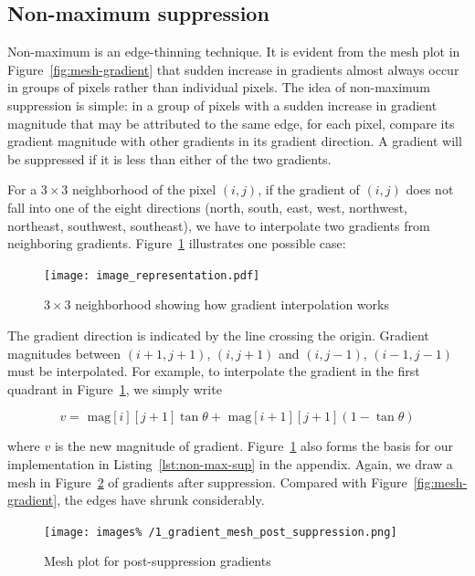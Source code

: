 \documentclass{ee208report}
\begin{document}
\begin{multicols*}{2}
\subsection{Non-maximum suppression}

Non-maximum is an edge-thinning technique. It is evident from the mesh plot in
Figure~\ref{fig:mesh-gradient} that sudden increase in gradients almost always
occur in groups of pixels rather than individual pixels. The idea of
non-maximum suppression is simple: in a group of pixels with a sudden increase
in gradient magnitude that may be attributed to the same edge, for each pixel,
compare its gradient magnitude with other gradients in its gradient direction.
A gradient will be suppressed if it is less than either of the two gradients.

For a $3 \times 3$ neighborhood of the pixel $(i, j)$, if the gradient of
$(i, j)$ does not fall into one of the eight directions (north, south, east,
west, northwest, northeast, southwest, southeast), we have to interpolate two
gradients from neighboring gradients. Figure~\ref{fig:neighborhood} illustrates
one possible case:

\begin{figure}[H]
    \texttt{[image: image\_representation.pdf]}
    \caption{$3 \times 3$ neighborhood showing how gradient interpolation works}
    \label{fig:neighborhood}
\end{figure}

The gradient direction is indicated by the line crossing the origin. Gradient
magnitudes between $(i + 1, j + 1)$, $(i, j + 1)$ and $(i, j - 1)$,
$(i - 1, j - 1)$ must be interpolated. For example, to interpolate the gradient
in the first quadrant in Figure~\ref{fig:neighborhood}, we simply write

\[
    v = \textrm{ mag}[i][j + 1] \tan \theta + \textrm{ mag}[i + 1][j + 1] (1 -
    \tan \theta)
\]

where $v$ is the new magnitude of gradient. Figure~\ref{fig:neighborhood} also
forms the basis for our implementation in Listing~\ref{lst:non-max-sup} in the
appendix. Again, we draw a mesh in Figure~\ref{fig:post-suppression-mesh} of
gradients after suppression. Compared with Figure~\ref{fig:mesh-gradient}, the
edges have shrunk considerably.

\begin{figure}[H]
    \texttt{[image: images\%
/1\_gradient\_mesh\_post\_suppression.png]}
    \caption{Mesh plot for post-suppression gradients}
    \label{fig:post-suppression-mesh}
\end{figure}


\end{multicols*}
\end{document}
